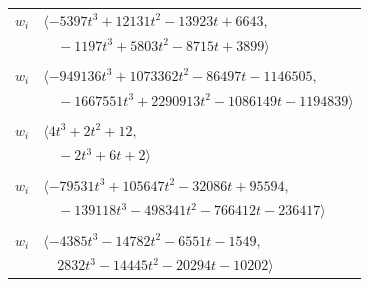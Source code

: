 \documentclass[11pt]{article}
\begin{document}
\begin{longtable}{@{}ll@{}}
$w_i$ & $\langle -5397t^{3}+12131t^{2}-13923t+6643,$\\
 & $\quad -1197t^{3}+5803t^{2}-8715t+3899\rangle$\\
\addlinespace[2pt]
\multicolumn{2}{@{}p{0.97\textwidth}@{}}{$i=24$, $D_i=512$, $\rho_{ij}$: $3{:}1, \allowbreak 9{:}1, \allowbreak 10{:}1, \allowbreak 11{:}1, \allowbreak 14{:}1, \allowbreak 16{:}2, \allowbreak 27{:}1, \allowbreak 28{:}1, \allowbreak 34{:}1, \allowbreak 37{:}2, \allowbreak 39{:}1, \allowbreak 40{:}2, \allowbreak 41{:}2, \allowbreak 44{:}2, \allowbreak 56{:}2, \allowbreak 59{:}2, \allowbreak 61{:}2, \allowbreak 63{:}1, \allowbreak 64{:}2$}\\
$w_i$ & $\langle -949136t^{3}+1073362t^{2}-86497t-1146505,$\\
 & $\quad -1667551t^{3}+2290913t^{2}-1086149t-1194839\rangle$\\
\addlinespace[2pt]
\multicolumn{2}{@{}p{0.97\textwidth}@{}}{$i=25$, $D_i=2$, $\rho_{ij}$: $8{:}1, \allowbreak 17{:}1, \allowbreak 27{:}2, \allowbreak 31{:}1, \allowbreak 37{:}1, \allowbreak 45{:}1, \allowbreak 49{:}1, \allowbreak 62{:}2$}\\
$w_i$ & $\langle 4t^{3}+2t^{2}+12,$\\
 & $\quad -2t^{3}+6t+2\rangle$\\
\addlinespace[2pt]
\multicolumn{2}{@{}p{0.97\textwidth}@{}}{$i=26$, $D_i=512$, $\rho_{ij}$: $3{:}2, \allowbreak 4{:}2, \allowbreak 11{:}1, \allowbreak 12{:}2, \allowbreak 14{:}1, \allowbreak 20{:}1, \allowbreak 27{:}2, \allowbreak 29{:}1, \allowbreak 30{:}1, \allowbreak 34{:}2, \allowbreak 36{:}2, \allowbreak 40{:}2, \allowbreak 43{:}1, \allowbreak 47{:}2, \allowbreak 57{:}1, \allowbreak 59{:}2, \allowbreak 61{:}2, \allowbreak 62{:}1, \allowbreak 64{:}1, \allowbreak 65{:}2$}\\
$w_i$ & $\langle -79531t^{3}+105647t^{2}-32086t+95594,$\\
 & $\quad -139118t^{3}-498341t^{2}-766412t-236417\rangle$\\
\addlinespace[2pt]
\multicolumn{2}{@{}p{0.97\textwidth}@{}}{$i=27$, $D_i=16$, $\rho_{ij}$: $1{:}2, \allowbreak 8{:}2, \allowbreak 17{:}2, \allowbreak 24{:}2, \allowbreak 25{:}1, \allowbreak 26{:}1, \allowbreak 39{:}2, \allowbreak 47{:}2, \allowbreak 49{:}2, \allowbreak 53{:}1, \allowbreak 55{:}1, \allowbreak 56{:}1, \allowbreak 60{:}1, \allowbreak 63{:}1$}\\
$w_i$ & $\langle -4385t^{3}-14782t^{2}-6551t-1549,$\\
 & $\quad 2832t^{3}-14445t^{2}-20294t-10202\rangle$\\

\end{longtable}
\end{document}
